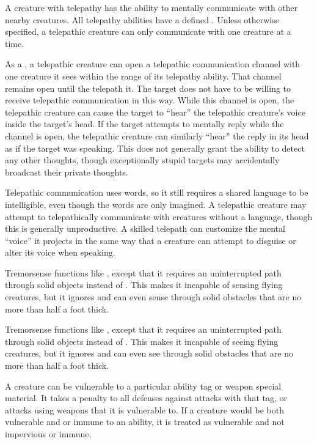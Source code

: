   A creature with telepathy has the ability to mentally communicate with other nearby creatures.
  All telepathy abilities have a defined .
  Unless otherwise specified, a telepathic creature can only communicate with one creature at a time.

  As a , a telepathic creature can open a telepathic communication channel with one creature it sees within the range of its telepathy ability.
  That channel remains open until the telepath  it.
  The target does not have to be willing to receive telepathic communication in this way.
  While this channel is open, the telepathic creature can cause the target to ``hear'' the telepathic creature's voice inside the target's head.
  If the target attempts to mentally reply while the channel is open, the telepathic creature can similarly ``hear'' the reply in its head as if the target was speaking.
  This does not generally grant the ability to detect any other thoughts, though exceptionally stupid targets may accidentally broadcast their private thoughts.

  Telepathic communication uses words, so it still requires a shared language to be intelligible, even though the words are only imagined.
  A telepathic creature may attempt to telepathically communicate with creatures without a language, though this is generally unproductive.
  A skilled telepath can customize the mental ``voice'' it projects in the same way that a creature can attempt to disguise or alter its voice when speaking.

  Tremorsense functions like , except that it requires an uninterrupted path through solid objects instead of .
  This makes it incapable of sensing flying creatures, but it ignores  and can even sense through solid obstacles that are no more than half a foot thick.

  Tremorsense functions like , except that it requires an uninterrupted path through solid objects instead of .
  This makes it incapable of seeing flying creatures, but it ignores  and can even see through solid obstacles that are no more than half a foot thick.

  A creature can be vulnerable to a particular ability tag or weapon special material.
  It takes a  penalty to all defenses against attacks with that tag, or attacks using weapons that it is vulnerable to.
  If a creature would be both vulnerable and \impervious or immune to an ability, it is treated as vulnerable and not impervious or immune.

